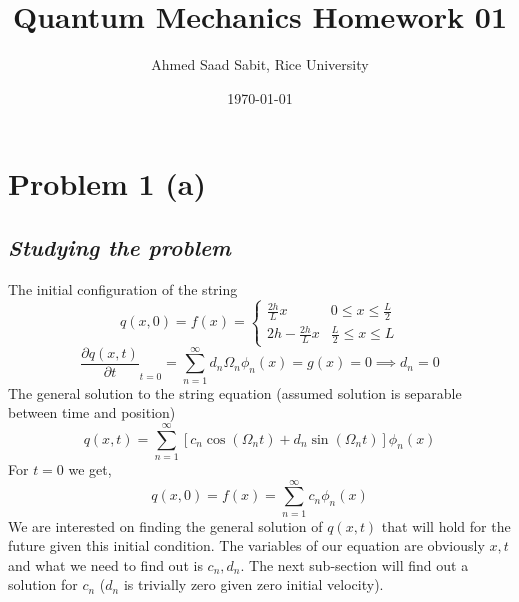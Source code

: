 \documentclass[letter]{article}
\title{Quantum Mechanics Homework 01}
\author{Ahmed Saad Sabit, Rice University}
\date{\today}
\begin{document}
\maketitle

\section*{Problem 1 (a)}
\subsection*{\emph{Studying the problem}}
The initial configuration of the string 
\[
q(x,0) = f(x) = 
\begin{cases}
	\frac{2h}{L}x & 0 \le x \le \frac{L}{2} \\
	2h - \frac{2h}{L}x & \frac{L}{2} \le  x \le  L 
\end{cases}
\]
\[
	\frac{\partial q(x,t)}{\partial t} _{t=0} = \sum_{n=1}^{\infty} d_n \Omega_n \phi_n(x) = g(x) = 0 \implies \boxed{
	d_n = 0
	} 
\] 
The general solution to the string equation (assumed solution is separable between time and position)
\[
	q(x,t) = \sum_{n=1}^{\infty} [c_n \cos(\Omega_n t) + d_n \sin(\Omega_n t) ] \phi_n(x)
\]
For $t = 0$ we get, 
\[
	q(x,0) = f(x) = \sum_{n=1}^{\infty} c_n \phi_n(x)\] 
We are interested on finding the general solution of $q(x,t)$ that will hold for the future given this initial condition. The variables of our equation are obviously $x,t$ and what we need to find out is $c_n, d_n$. The next sub-section will find out a solution for $c_n$ ($d_n$ is trivially zero given zero initial velocity).
\end{document}
